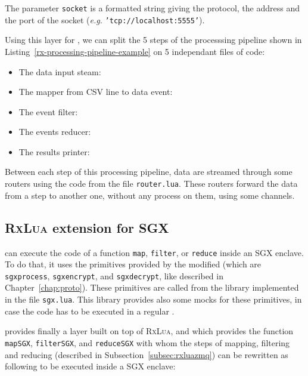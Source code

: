 The parameter \texttt{socket} is a formatted string giving the protocol, the address and the port of the socket (\textit{e.g.} \texttt{'tcp://localhost:5555'}).

Using this layer for \zmq{}, we can split the 5 steps of the processsing pipeline shown in Listing~\ref{rx-processing-pipeline-example} on 5 independant files of \lua{} code:

\begin{itemize}[leftmargin=*]
  \item The data input steam:
    
  \item The mapper from \textsc{CSV} line to data event:
    
  \item The event filter:
    
  \item The events reducer:
    
  \item The results printer:
    
\end{itemize}

Between each step of this processing pipeline, data are streamed through some routers using the code from the file \texttt{router.lua}.
These routers forward the data from a step to another one, without any process on them, using some \zmq{} channels.

\newpage

\subsection{\textsc{RxLua} extension for SGX}
\label{subsec:rxluasgx}

\SS{} can execute the code of a function \texttt{map}, \texttt{filter}, or \texttt{reduce} inside an SGX enclave.
To do that, it uses the primitives provided by the modified \luavm{} (which are \texttt{sgxprocess}, \texttt{sgxencrypt}, and \texttt{sgxdecrypt}, like described in Chapter~\ref{chap:proto}).
These primitives are called from the library implemented in the file \texttt{sgx.lua}.
This library provides also some mocks for these primitives, in case the code has to be executed in a regular \luavm{}.

\SS{} provides finally a layer built on top of \textsc{RxLua}, and which provides the function \texttt{mapSGX}, \texttt{filterSGX}, and \texttt{reduceSGX} with whom the steps of mapping, filtering and reducing (described in Subsection~\ref{subsec:rxluazmq}) can be rewritten as following to be executed inside a SGX enclave:

